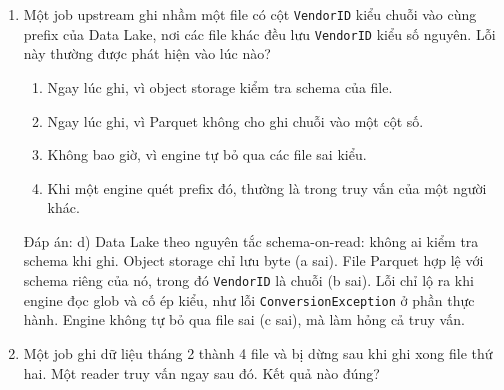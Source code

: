 \documentclass[12pt]{article}
\begin{document}
\begin{enumerate}[label=\textbf{\arabic*.}, leftmargin=1.6em, itemsep=1.2em]
\begin{enumerate}[label=\alph*), leftmargin=2.2em, itemsep=1pt]
    \item Cả 4 row group, đọc tất cả các cột.
    \item Chỉ RG3, và chỉ hai cột \texttt{fare\_amount}, \texttt{tip\_amount}.
    \item Chỉ RG3, nhưng đọc tất cả các cột.
    \item Cả 4 row group, nhưng chỉ đọc cột \texttt{tip\_amount}.
\end{enumerate}
\begin{guidelinebox}{Đáp án: b)}
Predicate pushdown bỏ qua RG1, RG2 và RG4 vì giá trị lớn nhất của chúng đều nhỏ hơn 100. Chỉ RG3 (max = 480) có thể chứa dòng thỏa điều kiện. Projection pushdown chỉ đọc các cột truy vấn cần: \texttt{fare\_amount} để lọc và \texttt{tip\_amount} để tính trung bình. Phương án (d) sai vì vẫn phải đọc \texttt{fare\_amount} để kiểm tra điều kiện từng dòng trong RG3.
\end{guidelinebox}

\item Một job upstream ghi nhầm một file có cột \texttt{VendorID} kiểu chuỗi vào cùng prefix của Data Lake, nơi các file khác đều lưu \texttt{VendorID} kiểu số nguyên. Lỗi này thường được phát hiện vào lúc nào?

\begin{enumerate}[label=\alph*), leftmargin=2.2em, itemsep=1pt]
    \item Ngay lúc ghi, vì object storage kiểm tra schema của file.
    \item Ngay lúc ghi, vì Parquet không cho ghi chuỗi vào một cột số.
    \item Không bao giờ, vì engine tự bỏ qua các file sai kiểu.
    \item Khi một engine quét prefix đó, thường là trong truy vấn của một người khác.
\end{enumerate}
\begin{guidelinebox}{Đáp án: d)}
Data Lake theo nguyên tắc schema-on-read: không ai kiểm tra schema khi ghi. Object storage chỉ lưu byte (a sai). File Parquet hợp lệ với schema riêng của nó, trong đó \texttt{VendorID} là chuỗi (b sai). Lỗi chỉ lộ ra khi engine đọc glob và cố ép kiểu, như lỗi \texttt{ConversionException} ở phần thực hành. Engine không tự bỏ qua file sai (c sai), mà làm hỏng cả truy vấn.
\end{guidelinebox}

\item Một job ghi dữ liệu tháng 2 thành 4 file và bị dừng sau khi ghi xong file thứ hai. Một reader truy vấn ngay sau đó. Kết quả nào đúng?


\end{enumerate}
\end{document}
